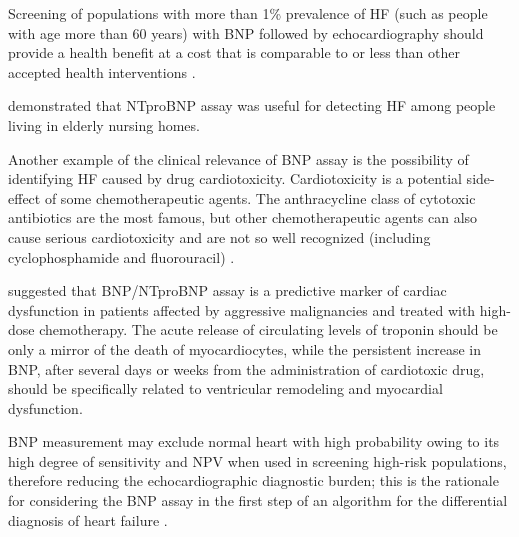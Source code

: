 \documentclass[14pt,a4paper,onecolumn]{extarticle}
\begin{document}
Screening of populations with more than 1\% prevalence of HF (such as people with age more than 60 years) with BNP followed by echocardiography should provide a health benefit at a cost that is comparable to or less than other accepted health interventions \citep{bib3145}.

\citep{bib3147} demonstrated that NTproBNP assay was useful for detecting HF among people living in elderly nursing homes.

Another example of the clinical relevance of BNP assay is the possibility of identifying HF caused by drug cardiotoxicity. Cardiotoxicity is a potential side-effect of some chemotherapeutic agents. The anthracycline class of cytotoxic antibiotics are the most famous, but other chemotherapeutic agents can also cause serious cardiotoxicity and are not so well recognized (including cyclophosphamide and fluorouracil) \citep{bib3154}.


\citep{bib3162} suggested that BNP/NTproBNP assay is a predictive marker of cardiac dysfunction in patients affected by aggressive malignancies and treated with high-dose chemotherapy. The acute release of circulating levels of troponin should be only a mirror of the death of myocardiocytes, while the persistent increase in BNP, after several days or weeks from the administration of cardiotoxic drug, should be specifically related to ventricular remodeling and myocardial dysfunction.

BNP measurement may exclude normal heart with high probability owing to its high degree of sensitivity and NPV when used in screening high-risk populations, therefore reducing the echocardiographic diagnostic burden; this is the rationale for considering the BNP assay in the first step of an algorithm for the differential diagnosis of heart failure \citep{bib365}.
\end{document}

